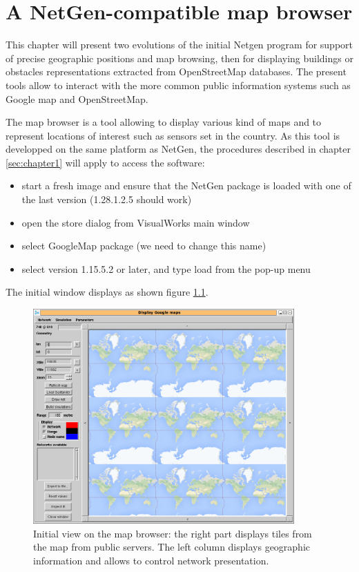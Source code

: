 
\chapter{A NetGen-compatible map browser}

\label{sec:chapter5}

This chapter will present two evolutions of the initial Netgen program for 
support of precise geographic positions and map browsing, then for displaying 
buildings or obstacles representations extracted from OpenStreetMap databases. 
The present tools allow to interact with the more common public information systems 
such as Google map and OpenStreetMap. 

The map browser is a tool allowing to display various kind of maps and to represent 
locations of interest such as sensors set in the country. 
As this tool is developped on the same platform as NetGen, the procedures described 
in chapter \ref{sec:chapter1} will apply to access the software: 
\begin{itemize}
\item start a fresh image and ensure that the NetGen package is loaded with one of the last 
version (1.28.1.2.5 should work)
\item open the store dialog from VisualWorks main window
\item select GoogleMap package (we need to change this name)
\item select version 1.15.5.2 or later, and type load from the pop-up menu
\end{itemize}

The initial window displays as shown figure \ref{fig:initialGmap}. 

\begin{figure}
\begin{center} 
\includegraphics[width=10cm]{gmap.png}
\caption{Initial view on the map browser: the right part displays tiles from the map 
from public servers. The left column displays geographic information and allows 
to control network presentation. }
\label{fig:initialGmap}
\end{center}
\end{figure}

